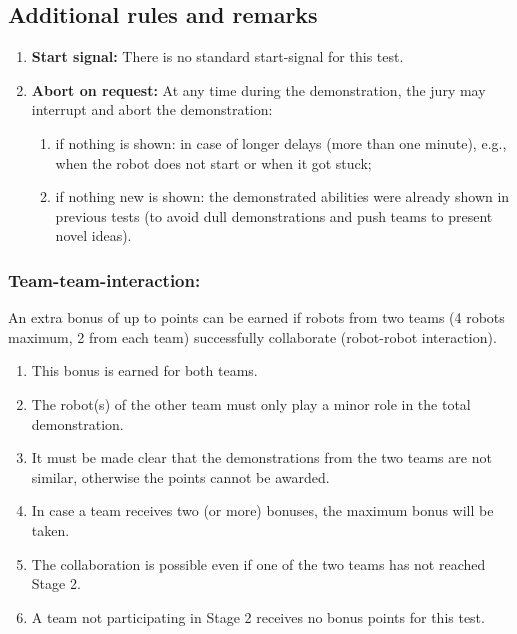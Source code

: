 \subsection{Additional rules and remarks}
\begin{enumerate}
	\item \textbf{Start signal:} There is no standard start-signal for this test.
	\item \textbf{Abort on request:} At any time during the demonstration, the jury may interrupt and abort the demonstration:
	\begin{enumerate}
		\item if nothing is shown: in case of longer delays (more than one minute), e.g., when the robot does not start or when it got stuck;
		\item if nothing new is shown: the demonstrated abilities were already shown in previous tests (to avoid dull demonstrations and push teams to present novel ideas).
	\end{enumerate}
\end{enumerate}

\subsubsection{Team-team-interaction:}
\label{rule:OC-team-team-interaction}
An extra bonus of up to \bonusRobotCoop points can be earned if robots from two teams (4 robots maximum, 2 from each team) successfully collaborate (robot-robot interaction).
\begin{enumerate}
	\item This bonus is earned for both teams.
	\item The robot(s) of the other team must only play a minor role in the total demonstration.
	\item It must be made clear that the demonstrations from the two teams are not similar, otherwise the points cannot be awarded.
	\item In case a team receives two (or more) bonuses, the maximum bonus will be taken.
	\item The collaboration is possible even if one of the two teams has not reached Stage 2.
	\item A team not participating in Stage 2 receives no bonus points for this test.
\end{enumerate}


